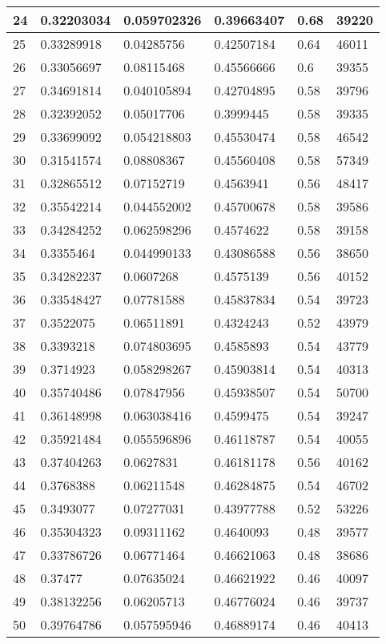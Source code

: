 \begin{longtable}{|l|l|l|l|l|l|}
24 & 0.32203034 & 0.059702326 & 0.39663407 & 0.68 & 39220 \\ \hline 
25 & 0.33289918 & 0.04285756 & 0.42507184 & 0.64 & 46011 \\ \hline 
26 & 0.33056697 & 0.08115468 & 0.45566666 & 0.6 & 39355 \\ \hline 
27 & 0.34691814 & 0.040105894 & 0.42704895 & 0.58 & 39796 \\ \hline 
28 & 0.32392052 & 0.05017706 & 0.3999445 & 0.58 & 39335 \\ \hline 
29 & 0.33699092 & 0.054218803 & 0.45530474 & 0.58 & 46542 \\ \hline 
30 & 0.31541574 & 0.08808367 & 0.45560408 & 0.58 & 57349 \\ \hline 
31 & 0.32865512 & 0.07152719 & 0.4563941 & 0.56 & 48417 \\ \hline 
32 & 0.35542214 & 0.044552002 & 0.45700678 & 0.58 & 39586 \\ \hline 
33 & 0.34284252 & 0.062598296 & 0.4574622 & 0.58 & 39158 \\ \hline 
34 & 0.3355464 & 0.044990133 & 0.43086588 & 0.56 & 38650 \\ \hline 
35 & 0.34282237 & 0.0607268 & 0.4575139 & 0.56 & 40152 \\ \hline 
36 & 0.33548427 & 0.07781588 & 0.45837834 & 0.54 & 39723 \\ \hline 
37 & 0.3522075 & 0.06511891 & 0.4324243 & 0.52 & 43979 \\ \hline 
38 & 0.3393218 & 0.074803695 & 0.4585893 & 0.54 & 43779 \\ \hline 
39 & 0.3714923 & 0.058298267 & 0.45903814 & 0.54 & 40313 \\ \hline 
40 & 0.35740486 & 0.07847956 & 0.45938507 & 0.54 & 50700 \\ \hline 
41 & 0.36148998 & 0.063038416 & 0.4599475 & 0.54 & 39247 \\ \hline 
42 & 0.35921484 & 0.055596896 & 0.46118787 & 0.54 & 40055 \\ \hline 
43 & 0.37404263 & 0.0627831 & 0.46181178 & 0.56 & 40162 \\ \hline 
44 & 0.3768388 & 0.06211548 & 0.46284875 & 0.54 & 46702 \\ \hline 
45 & 0.3493077 & 0.07277031 & 0.43977788 & 0.52 & 53226 \\ \hline 
46 & 0.35304323 & 0.09311162 & 0.4640093 & 0.48 & 39577 \\ \hline 
47 & 0.33786726 & 0.06771464 & 0.46621063 & 0.48 & 38686 \\ \hline 
48 & 0.37477 & 0.07635024 & 0.46621922 & 0.46 & 40097 \\ \hline 
49 & 0.38132256 & 0.06205713 & 0.46776024 & 0.46 & 39737 \\ \hline 
50 & 0.39764786 & 0.057595946 & 0.46889174 & 0.46 & 40413 \\ \hline 
\end{longtable}